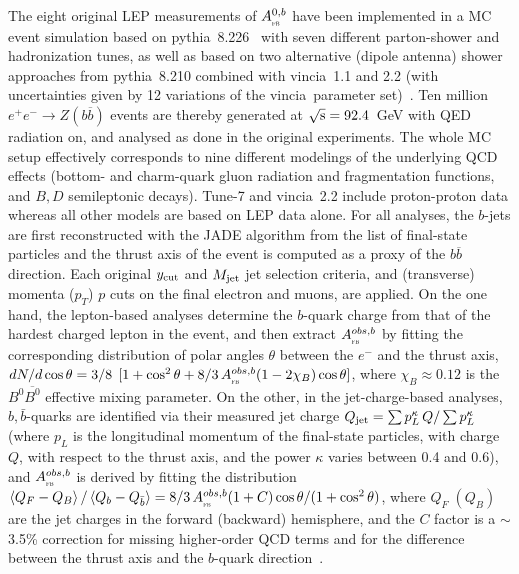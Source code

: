\documentclass{moriond}
\newcommand{\sqrts}{\sqrt{\rm s}}
\newcommand{\epem}{e^+e^-}
\providecommand{\bbbar}{b\overline{b}}
\newcommand{\AFBb}  {A_{_{\textsc{fb}}}^{0,b}}
\newcommand{\AFBobs}  {A_{_{\textsc{fb}}}^{obs,b}}
\newcommand{\pythia}{{\sc pythia}}
\newcommand{\vincia}{{\sc vincia}}
\def\mean#1{\ensuremath{\left<#1\right>}}
\begin{document}
The eight original LEP measurements of $\AFBb$ %
have been implemented in a MC event simulation based on \pythia~8.226~\cite{pythia8} with seven 
different parton-shower and hadronization tunes, as well as based on two alternative (dipole antenna) shower
approaches from \pythia~8.210 combined with \vincia~1.1 and 2.2 (with uncertainties given by
12 variations of the \vincia\ parameter set)~\cite{vincia}. Ten million $\epem\to Z(\bbbar)$ events are thereby generated
at $\sqrts = 92.4$~GeV with QED radiation on, %
and analysed as done in the original experiments. The whole MC setup effectively corresponds 
to nine different modelings of the underlying QCD effects (bottom- and charm-quark gluon radiation and 
fragmentation functions, and $B,D$ semileptonic decays). Tune-7 and \vincia~2.2 include proton-proton 
data whereas all other models are based on LEP data alone.
For all analyses, the $b$-jets are first reconstructed with the JADE algorithm %
from the list of final-state particles and the thrust axis of the event is computed as a proxy of the $\bbbar$ 
direction. Each original $y_{\rm cut}$ and $M_{\rm jet}$ jet selection criteria, and %
(transverse) momenta ($p_T$) $p$ cuts on the final electron and muons, are applied. On the one hand, %
the lepton-based analyses determine the $b$-quark charge from that of the hardest charged lepton in the
event, and then extract $\AFBobs$ by fitting the corresponding distribution of polar angles $\theta$ between 
the $e^-$ and the thrust axis, $dN/d\cos\theta = 3/8\,\;[1+\cos^2\theta+8/3\,\AFBobs(1-2\chi_B)\cos\theta]$, where
$\chi_B\approx 0.12$ is the $B^0\overline{B^0}$ effective mixing parameter.
On the other, in the jet-charge-based analyses, $b,\bar{b}$-quarks are identified via their
measured jet charge $Q_{\rm jet}=\sum p_L^\kappa\,Q/\sum p_L^\kappa$ (where $p_L$
is the longitudinal momentum of the final-state particles, with charge $Q$, with respect
to the thrust axis, and the power $\kappa$ varies between 0.4 and 0.6), and $\AFBobs$ is derived 
by fitting the distribution
$\mean{Q_F-Q_B}/\mean{Q_b-Q_{\bar{b}}}=8/3\,\AFBobs(1+C)\cos\theta/(1+\cos^2\theta)$,
where $Q_F\;(Q_B)$ are the jet charges in the forward (backward) hemisphere, and the
$C$ factor is a $\sim$3.5\% correction for missing higher-order QCD terms and for the 
difference between the thrust axis and the $b$-quark direction~\cite{ALEPH:2005ab,Abbaneo:1998xt}. 
\end{document}
